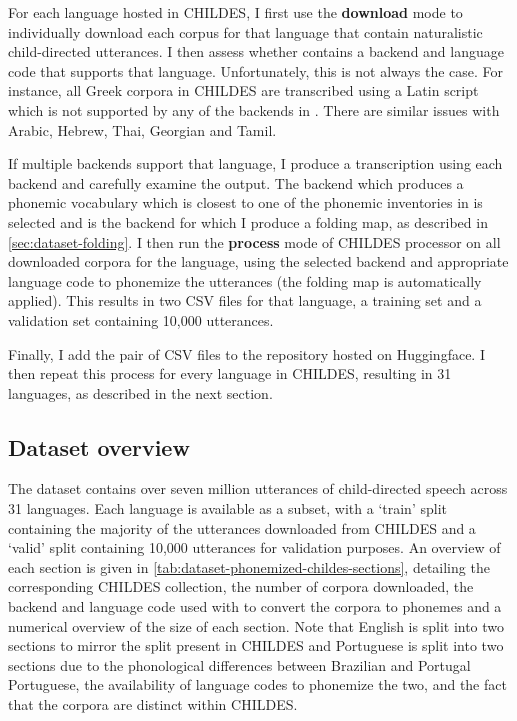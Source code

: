 For each language hosted in CHILDES, I first use the \textbf{download} mode to individually download each corpus for that language that contain naturalistic child-directed utterances. I then assess whether \corpusphonemizer contains a backend and language code that supports that language. Unfortunately, this is not always the case. For instance, all Greek corpora in CHILDES are transcribed using a Latin script which is not supported by any of the backends in \corpusphonemizer. There are similar issues with Arabic, Hebrew, Thai, Georgian and Tamil.

If multiple backends support that language, I produce a transcription using each backend and carefully examine the output. The backend which produces a phonemic vocabulary which is closest to one of the phonemic inventories in \phoible is selected and is the backend for which I produce a folding map, as described in \cref{sec:dataset-folding}. I then run the \textbf{process} mode of CHILDES processor on all downloaded corpora for the language, using the selected backend and appropriate language code to phonemize the utterances (the folding map is automatically applied). This results in two CSV files for that language, a training set and a validation set containing 10,000 utterances.

Finally, I add the pair of CSV files to the \phonemizedchildes repository hosted on Huggingface. I then repeat this process for every language in CHILDES, resulting in 31 languages, as described in the next section. 

\subsection{Dataset overview}
\label{sec:dataset-phonemized-childes-overview}

The \phonemizedchildes dataset contains over seven million utterances of child-directed speech across 31 languages. Each language is available as a subset, with a `train' split containing the majority of the utterances downloaded from CHILDES and a `valid' split containing 10,000 utterances for validation purposes. An overview of each section is given in \cref{tab:dataset-phonemized-childes-sections}, detailing the corresponding CHILDES collection, the number of corpora downloaded, the backend and language code used with \corpusphonemizer to convert the corpora to phonemes and a numerical overview of the size of each section. Note that English is split into two sections to mirror the split present in CHILDES and Portuguese is split into two sections due to the phonological differences between Brazilian and Portugal Portuguese, the availability of language codes to phonemize the two, and the fact that the corpora are distinct within CHILDES.

